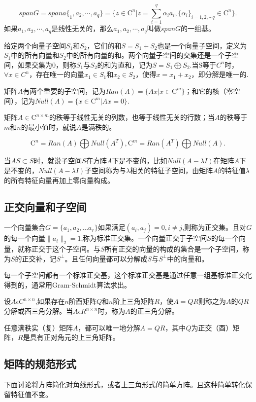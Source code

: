 \documentclass{article}
\begin{document}
$$spanG=spana\lbrace_1,a_2,\cdots,a_q\rbrace=\lbrace z\in\mathrm{C}^n|z=\sum_{i=1}^q{\alpha _i a_i},\lbrace\alpha _i\rbrace_{i=1,2,\cdots q}\in\mathrm{C}^n\rbrace.$$
如果$a_1,a_2,\cdots,a_q$是线性无关的，那么$a_1,a_2,\cdots,a_q$叫做$span{G}$的一组基。

给定两个向量子空间$S_1$和$S_2$，它们的和$S=S_1+S_2$也是一个向量子空间，定义为$S_1$中的所有向量和$S_2$中的所有向量的和。两个向量子空间的交集还是一个子空间，如果交集为${0}$，则称$S_1$与$S_2$的和为直和，记为$S=S_1\bigoplus S_2$.当S等于$C^n$时，$\forall x\in C^n$，存在唯一的向量$x_1\in S_1$和$x_2\in S_2$，使得$x=x_1+x_2$，即分解是唯一的.

矩阵$A$有两个重要的子空间，记为$Ran(A)=\lbrace Ax|x\in\mathrm{C}^m\rbrace$；和它的核（零空间），记为$Null(A)=\lbrace x\in\mathrm{C}^m|Ax=0\rbrace$.
 
矩阵$A\in\mathrm{C}^{n\times m}$的秩等于线性无关的列数，也等于线性无关的行数；当$A$的秩等于$m$和$n$的最小值时，就说$A$是满秩的。

$$\mathrm{C}^n=Ran(A)\bigoplus Null(A^T),\mathrm{C}^m=Ran(A^T)\bigoplus Null(A).$$

当$AS\subset S$时，就说子空间$S$在方阵$A$下是不变的，比如$Null(A-\lambda I)$在矩阵$A$下是不变的，$Null(A-\lambda I)$子空间称为与$\lambda$相关的特征子空间，由矩阵$A$的特征值$\lambda$的所有特征向量再加上零向量构成。

\subsection{正交向量和子空间}
一个向量集合$G=\lbrace a_1,a_2,...a_r\rbrace$如果满足$(a_i,a_j)=0,i\neq j$,则称为正交集。且对$G$的每一个向量$\parallel a_i \parallel_2=1$,称为标准正交集。一个向量正交于子空间$S$的每一个向量，就称正交于这个子空间。与$S$所有正交的向量的构成的集合是一个子空间，称为$S$的正交补，记$S^\perp$。且任何向量都可以分解成$S$与$S^\perp$中的向量和。

每一个子空间都有一个标准正交基，这个标准正交基是通过任意一组基标准正交化得到的，通常用Gram-Schmidt算法求出。

\begin{definition}
设$A\epsilon C^{n\times n}$,如果存在$n$阶酉矩阵$Q$和$n$阶上三角矩阵$R$，使$A=QR$则称之为$A$的$QR$分解或酉三角分解。当$A\epsilon R^{n\times n}$时，称为$A$的正三角分解。
\end{definition}

任意满秩实（复）矩阵$A$，都可以唯一地分解$A=QR$，其中$Q$为正交（酉）矩阵，$R$是具有正对角元的上三角矩阵。
\subsection{矩阵的规范形式}
下面讨论将方阵简化对角线形式，或者上三角形式的简单方阵。且这种简单转化保留特征值不变。
\end{document}
